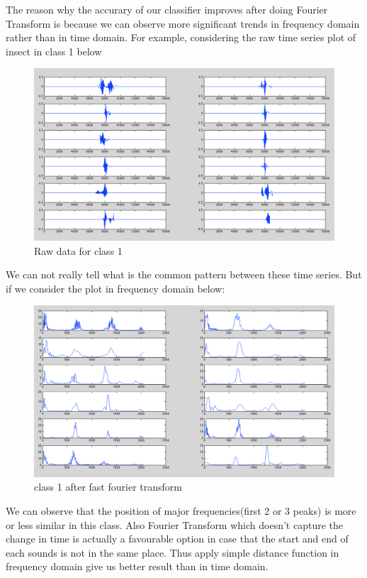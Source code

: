\begin{enumerate}
The reason why the accurary of our classifier improves after doing Fourier Transform is because we can observe more significant trends in frequency domain rather than in time domain. For example, considering the raw time series plot of insect in class 1 below
\begin{figure}[H]
\includegraphics[scale=.4]{PIC/raw_class1.png}
\caption{Raw data for class 1}
\end{figure}
We can not really tell what is the common pattern between these time series. But if we consider the plot in frequency domain below:
\begin{figure}[H]
\includegraphics[scale=.4]{PIC/extracted_ffted_class1.png}
\caption{class 1 after fast fourier transform}
\end{figure}
We can observe that the position of major frequencies(first 2 or 3 peaks) is more or less similar in this class. Also Fourier Transform which doesn't capture the change in time is actually a favourable option in case that the start and end of each sounds is not in the same place. Thus apply simple distance function in frequency domain give us better result than in time domain. 


\end{enumerate}
